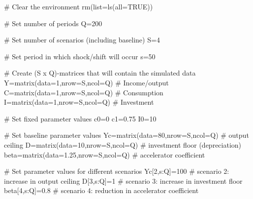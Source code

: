 \documentclass[
  letterpaper,
  DIV=11,
  numbers=noendperiod]{scrreprt}
\newenvironment{Shaded}{\begin{snugshade}}{\end{snugshade}}
\newcommand{\AttributeTok}[1]{\textcolor[rgb]{0.40,0.45,0.13}{#1}}
\newcommand{\CommentTok}[1]{\textcolor[rgb]{0.37,0.37,0.37}{#1}}
\newcommand{\ConstantTok}[1]{\textcolor[rgb]{0.56,0.35,0.01}{#1}}
\newcommand{\DecValTok}[1]{\textcolor[rgb]{0.68,0.00,0.00}{#1}}
\newcommand{\FloatTok}[1]{\textcolor[rgb]{0.68,0.00,0.00}{#1}}
\newcommand{\FunctionTok}[1]{\textcolor[rgb]{0.28,0.35,0.67}{#1}}
\newcommand{\NormalTok}[1]{\textcolor[rgb]{0.00,0.23,0.31}{#1}}
\newcommand{\OtherTok}[1]{\textcolor[rgb]{0.00,0.23,0.31}{#1}}
\newcommand{\SpecialCharTok}[1]{\textcolor[rgb]{0.37,0.37,0.37}{#1}}
\begin{document}
\begin{Shaded}
\begin{Highlighting}[]
\CommentTok{\# Clear the environment}
\FunctionTok{rm}\NormalTok{(}\AttributeTok{list=}\FunctionTok{ls}\NormalTok{(}\AttributeTok{all=}\ConstantTok{TRUE}\NormalTok{))}

\CommentTok{\# Set number of periods}
\NormalTok{Q}\OtherTok{=}\DecValTok{200}

\CommentTok{\# Set number of scenarios (including baseline)}
\NormalTok{S}\OtherTok{=}\DecValTok{4}

\CommentTok{\# Set period in which shock/shift will occur}
\NormalTok{s}\OtherTok{=}\DecValTok{50}

\CommentTok{\# Create (S x Q){-}matrices that will contain the simulated data}
\NormalTok{Y}\OtherTok{=}\FunctionTok{matrix}\NormalTok{(}\AttributeTok{data=}\DecValTok{1}\NormalTok{,}\AttributeTok{nrow=}\NormalTok{S,}\AttributeTok{ncol=}\NormalTok{Q) }\CommentTok{\# Income/output}
\NormalTok{C}\OtherTok{=}\FunctionTok{matrix}\NormalTok{(}\AttributeTok{data=}\DecValTok{1}\NormalTok{,}\AttributeTok{nrow=}\NormalTok{S,}\AttributeTok{ncol=}\NormalTok{Q) }\CommentTok{\# Consumption}
\NormalTok{I}\OtherTok{=}\FunctionTok{matrix}\NormalTok{(}\AttributeTok{data=}\DecValTok{1}\NormalTok{,}\AttributeTok{nrow=}\NormalTok{S,}\AttributeTok{ncol=}\NormalTok{Q) }\CommentTok{\# Investment}

\CommentTok{\# Set fixed parameter values}
\NormalTok{c0}\OtherTok{=}\DecValTok{0}
\NormalTok{c1}\OtherTok{=}\FloatTok{0.75}
\NormalTok{I0}\OtherTok{=}\DecValTok{10}

\CommentTok{\# Set baseline parameter values}
\NormalTok{Yc}\OtherTok{=}\FunctionTok{matrix}\NormalTok{(}\AttributeTok{data=}\DecValTok{80}\NormalTok{,}\AttributeTok{nrow=}\NormalTok{S,}\AttributeTok{ncol=}\NormalTok{Q)      }\CommentTok{\# output ceiling}
\NormalTok{D}\OtherTok{=}\FunctionTok{matrix}\NormalTok{(}\AttributeTok{data=}\DecValTok{10}\NormalTok{,}\AttributeTok{nrow=}\NormalTok{S,}\AttributeTok{ncol=}\NormalTok{Q)       }\CommentTok{\# investment floor (depreciation)}
\NormalTok{beta}\OtherTok{=}\FunctionTok{matrix}\NormalTok{(}\AttributeTok{data=}\FloatTok{1.25}\NormalTok{,}\AttributeTok{nrow=}\NormalTok{S,}\AttributeTok{ncol=}\NormalTok{Q)  }\CommentTok{\# accelerator coefficient}

\CommentTok{\# Set parameter values for different scenarios}
\NormalTok{Yc[}\DecValTok{2}\NormalTok{,s}\SpecialCharTok{:}\NormalTok{Q]}\OtherTok{=}\DecValTok{100} \CommentTok{\# scenario 2: increase in output ceiling}
\NormalTok{D[}\DecValTok{3}\NormalTok{,s}\SpecialCharTok{:}\NormalTok{Q]}\OtherTok{=}\DecValTok{1}    \CommentTok{\# scenario 3: increase in investment floor}
\NormalTok{beta[}\DecValTok{4}\NormalTok{,s}\SpecialCharTok{:}\NormalTok{Q]}\OtherTok{=}\FloatTok{0.8} \CommentTok{\# scenario 4: reduction in accelerator coefficient}


\end{Highlighting}
\end{Shaded}
\end{document}

